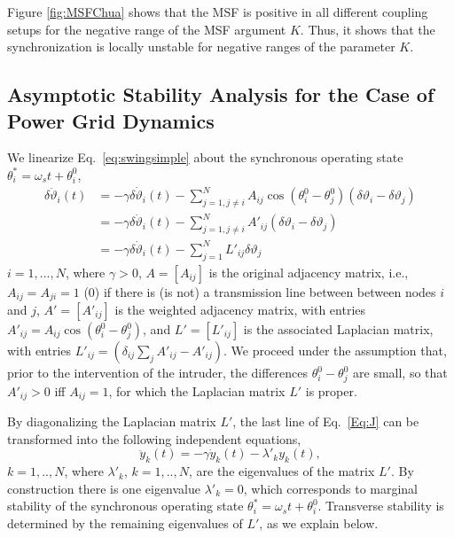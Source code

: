 \documentclass[%
 reprint,
 amsmath,amssymb,
 aip,
]{revtex4-2}
\theoremstyle{italichead}
\theoremstyle{definition}
\begin{document}
{Figure \ref{fig:MSFChua} shows that the MSF is positive in all different coupling setups for the negative range of the MSF argument $K$. 
Thus, it shows that the synchronization is locally unstable for negative ranges of the parameter $K$.







\subsection{Asymptotic Stability Analysis for the Case of Power Grid Dynamics \label{Sec:MAII}}

We linearize Eq.\  \eqref{eq:swingsimple} about the synchronous operating state $\theta_i^*= \omega_s t+ \theta_i^0$,
\begin{equation} \label{Eq:J}
\begin{aligned}
     \delta \ddot{\vartheta}_i (t) &= - {\gamma} {\delta \dot\vartheta}_i (t) - \sum_{j= 1, j \neq i}^N A_{ij} \cos(\theta_i^0 - \theta_j^0) (\delta \vartheta_i-\delta \vartheta_j)\\
     &= - {\gamma} {\delta \dot\vartheta}_i (t) - \sum_{j= 1, j \neq i}^N A'_{ij}  (\delta \vartheta_i-\delta \vartheta_j)\\
     &= - {\gamma} {\delta \dot\vartheta}_i (t) - \sum_{j= 1}^N L'_{ij}  \delta \vartheta_j
     \end{aligned}
     \end{equation}
$i=1,...,N$, where $\gamma>0$, $A=[A_{ij}]$ is the original adjacency matrix,  i.e.,  $A_{ij}=A_{ji}=1$ ($0$) if there is (is not) a transmission line between between nodes $i$ and $j$, $A'=[A'_{ij}]$ is the weighted adjacency matrix,
with entries $A'_{ij}= A_{ij} \cos(\theta_i^0 - \theta_j^0)$, and $L'=[L'_{ij}]$ is the associated Laplacian matrix, with entries $L'_{ij}= (\delta_{ij} \sum_j A'_{ij}  - A'_{ij})$. We proceed under the assumption that, prior to the intervention of the intruder, the differences $\theta_i^0 - \theta_j^0$ are small, so that  $A'_{ij}>0$ iff $A_{ij}=1$, for which the Laplacian matrix $L'$ is proper.

By diagonalizing the Laplacian matrix $L'$, the last line of Eq.\ \eqref{Eq:J} can be transformed into the following independent equations,
\begin{equation} \label{Eq:JJ}
    \ddot{y}_k(t)= - {\gamma} {\dot y}_k (t) - \lambda'_{k}  y_k(t),
\end{equation}
$k=1,..,N$, where $\lambda'_{k}$, $k=1,..,N$,  are the eigenvalues of the matrix $L'$. By construction there is one eigenvalue $\lambda'_{k}=0$, which corresponds to marginal stability of the synchronous operating state $\theta_i^*= \omega_s t+ \theta_i^0$.
Transverse stability is determined by the remaining eigenvalues of $L'$, as we explain below. %

}
\end{document}
